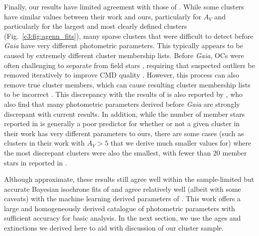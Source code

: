 Finally, our results have limited agreement with those of \cite{kharchenko_global_2013}. While some clusters have similar values between their work and ours, particularly for $A_V$ and particularly for the largest and most clearly defined clusters (Fig.~\ref{c3:fig:agenn_fits}), many sparse clusters that were difficult to detect before \emph{Gaia} have very different photometric parameters. This typically appears to be caused by extremely different  cluster membership lists. Before \emph{Gaia}, OCs were often challenging to separate from field stars \citep{cantat-gaudin_milky_2022}, requiring that suspected outliers be removed iteratively to improve CMD quality \citep{kharchenko_global_2012}. However, this process can also remove true cluster members, which can cause resulting cluster membership lists to be incorrect \citep{cantat-gaudin_clusters_2020}. This discrepancy with the results of \cite{kharchenko_global_2013} is also reported by \cite{cantat-gaudin_painting_2020}, who also find that many photometric parameters derived before \emph{Gaia} are strongly discrepant with current results. In addition, while the number of member stars reported in \cite{kharchenko_global_2013} is generally a poor predictor for whether or not a given cluster in their work has very different parameters to ours, there are some cases (such as clusters in their work with $A_V>5$ that we derive much smaller values for) where the most discrepant clusters were also the smallest, with fewer than 20 member stars in reported in \cite{kharchenko_global_2013}.

Although approximate, these results still agree well within the sample-limited but accurate Bayesian isochrone fits of \cite{bossini_age_2019} and agree relatively well (albeit with some caveats) with the machine learning derived parameters of \cite{cantat-gaudin_clusters_2020}. This work offers a large and homogeneously derived catalogue of photometric parameters with sufficient accuracy for basic analysis. In the next section, we use the ages and extinctions we derived here to aid with discussion of our cluster sample.



